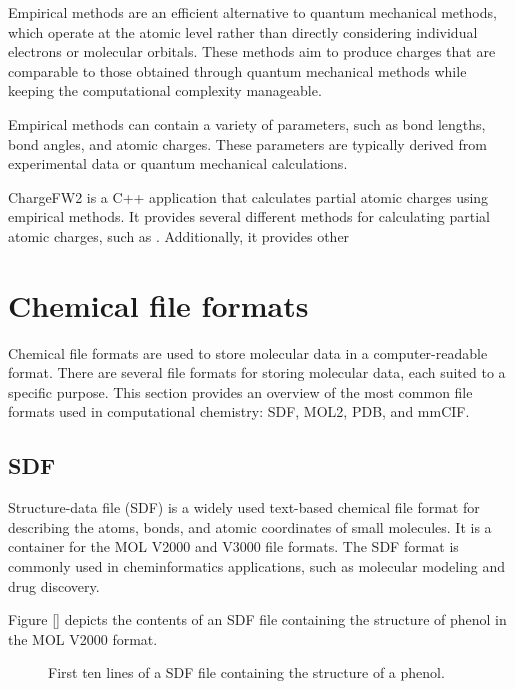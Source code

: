 \documentclass[
  digital,     %
  oneside,     %
  nosansbold,  %
  nocolorbold, %
  lof,         %
  lot,         %
]{fithesis4}
\begin{document}
Empirical methods are an efficient alternative to quantum mechanical methods, which operate at the atomic level rather than directly considering individual electrons or molecular orbitals. These methods aim to produce charges that are comparable to those obtained through quantum mechanical methods while keeping the computational complexity manageable. \cite{racek2022thesis}

Empirical methods can contain a variety of parameters, such as bond lengths, bond angles, and atomic charges. These parameters are typically derived from experimental data or quantum mechanical calculations. \cite{racek2022thesis}

ChargeFW2 is a C++ application that calculates partial atomic charges using empirical methods. It provides several different methods for calculating partial atomic charges, such as . Additionally, it provides other 

\section{Chemical file formats}
\label{section:chemical_file_formats}

Chemical file formats are used to store molecular data in a computer-readable format. There are several file formats for storing molecular data, each suited to a specific purpose. This section provides an overview of the most common file formats used in computational chemistry: SDF, MOL2, PDB, and mmCIF.

\subsection{SDF}
\label{subsection:sdf}

Structure-data file (SDF) is a widely used text-based chemical file format for describing the atoms, bonds, and atomic coordinates of small molecules. It is a container for the MOL V2000 and V3000 file formats. The SDF format is commonly used in cheminformatics applications, such as molecular modeling and drug discovery.

Figure \ref{} depicts the contents of an SDF file containing the structure of phenol in the MOL V2000 format.


\begin{figure}[htbp]
  \centering
  \lstset{
    basicstyle=\ttfamily,
    breaklines=true,
    columns=fullflexible
    }
    
    \caption{First ten lines of a SDF file containing the structure of a phenol.}
    \label{fig:sdf}
  \end{figure}
\end{document}
